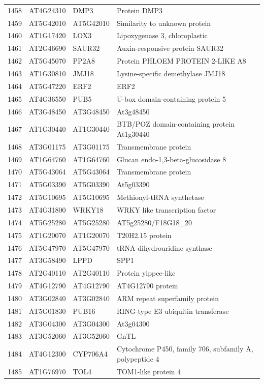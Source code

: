 \documentclass[11pt]{article}
\begin{document}
\begin{center}
\begin{tabular}{rlll}
1458 & AT4G24310 & DMP3 & Protein DMP3\\
1459 & AT5G42010 & AT5G42010 & Similarity to unknown protein\\
1460 & AT1G17420 & LOX3 & Lipoxygenase 3, chloroplastic\\
1461 & AT2G46690 & SAUR32 & Auxin-responsive protein SAUR32\\
1462 & AT5G45070 & PP2A8 & Protein PHLOEM PROTEIN 2-LIKE A8\\
1463 & AT1G30810 & JMJ18 & Lysine-specific demethylase JMJ18\\
1464 & AT5G47220 & ERF2 & ERF2\\
1465 & AT4G36550 & PUB5 & U-box domain-containing protein 5\\
1466 & AT3G48450 & AT3G48450 & At3g48450\\
1467 & AT1G30440 & AT1G30440 & BTB/POZ domain-containing protein At1g30440\\
1468 & AT3G01175 & AT3G01175 & Transmembrane protein\\
1469 & AT1G64760 & AT1G64760 & Glucan endo-1,3-beta-glucosidase 8\\
1470 & AT5G43064 & AT5G43064 & Transmembrane protein\\
1471 & AT5G03390 & AT5G03390 & At5g03390\\
1472 & AT5G10695 & AT5G10695 & Methionyl-tRNA synthetase\\
1473 & AT4G31800 & WRKY18 & WRKY like transcription factor\\
1474 & AT5G25280 & AT5G25280 & AT5g25280/F18G18\_20\\
1475 & AT1G20070 & AT1G20070 & T20H2.15 protein\\
1476 & AT5G47970 & AT5G47970 & tRNA-dihydrouridine synthase\\
1477 & AT3G58490 & LPPD & SPP1\\
1478 & AT2G40110 & AT2G40110 & Protein yippee-like\\
1479 & AT4G12790 & AT4G12790 & AT4G12790 protein\\
1480 & AT3G02840 & AT3G02840 & ARM repeat superfamily protein\\
1481 & AT5G01830 & PUB16 & RING-type E3 ubiquitin transferase\\
1482 & AT3G04300 & AT3G04300 & At3g04300\\
1483 & AT3G52060 & AT3G52060 & GnTL\\
1484 & AT4G12300 & CYP706A4 & Cytochrome P450, family 706, subfamily A, polypeptide 4\\
1485 & AT1G76970 & TOL4 & TOM1-like protein 4\\

\end{tabular}
\end{center}
\end{document}
